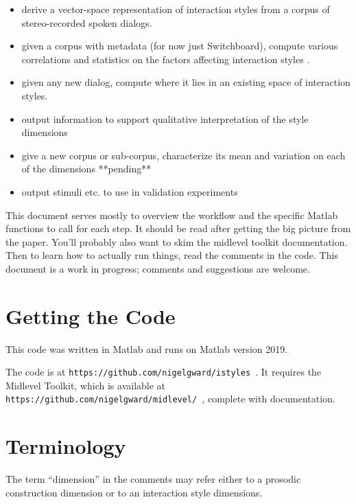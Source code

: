 \documentclass[11pt]{article}
\begin{document}
\begin{itemize}   \setlength{\itemsep}{0pt}\setlength{\parskip}{0pt}
\item derive a vector-space representation of interaction styles from
  a corpus of stereo-recorded spoken dialogs.
\item given a corpus with metadata (for now just  Switchboard), compute various
  correlations and statistics on the factors affecting interaction styles .
\item given any new dialog, compute where it lies in an existing space
  of interaction styles.
\item output information to support qualitative interpretation of the
  style dimensions
\item give a new corpus or sub-corpus, characterize its mean and
  variation on each of the dimensions **pending**
\item output stimuli etc. to use in validation experiments
\end{itemize}

This document serves mostly to overview the workflow and the specific
Matlab functions to call for each step.  It should be read after
getting the big picture from the paper.  You'll probably also want to
skim the midlevel toolkit documentation.  Then to learn how to
actually run things, read the comments in the code. This document is a
work in progress; comments and suggestions are welcome.


\section{Getting the Code}  \label{sec:starting}

This code was written in Matlab and runs on Matlab version 2019.

The code is at {\tt https://github.com/nigelgward/istyles }.  It requires
the Midlevel Toolkit, which is available at 
{\tt https://github.com/nigelgward/midlevel/ }, complete with documentation. 

\section{Terminology}

The term ``dimension'' in the comments may refer either to a prosodic
construction dimension or to an interaction style dimensions.
\end{document}
